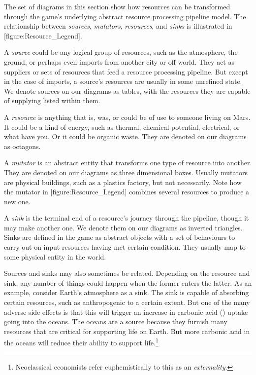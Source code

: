
The set of diagrams in this section show how resources can be transformed through the game's underlying abstract resource processing pipeline model. The relationship between {\it sources}, {\it mutators}, {\it resources}, and {\it sinks} is illustrated in [figure:Resource_Legend].

    {}
    
A {\it source} could be any logical group of resources, such as the atmosphere, the ground, or perhaps even imports from another city or off world.  They act as suppliers or sets of resources that feed a resource processing pipeline. But except in the case of imports, a source's resources are usually in some unrefined state. We denote sources on our diagrams as tables, with the resources they are capable of supplying listed within them.

A {\it resource} is anything that is, was, or could be of use to someone living on Mars. It could be a kind of energy, such as thermal, chemical potential, electrical, or what have you. Or it could be organic waste. They are denoted on our diagrams as octagons.

A {\it mutator} is an abstract entity that transforms one type of resource into another. They are denoted on our diagrams as three dimensional boxes. Usually mutators are physical buildings, such as a plastics factory, but not necessarily. Note how the mutator in [figure:Resource_Legend] combines several resources to produce a new one.

A {\it sink} is the terminal end of a resource's journey through the pipeline, though it may make another one. We denote them on our diagrams as inverted triangles. Sinks are defined in the game as abstract objects with a set of behaviours to carry out on input resources having met certain condition. They usually map to some physical entity in the world. 

Sources and sinks may also sometimes be related. Depending on the resource and sink, any number of things could happen when the former enters the latter. As an example, consider Earth's atmosphere as a sink. The sink is capable of absorbing certain resources, such as anthropogenic  to a certain extent. But one of the many adverse side effects is that this will trigger an increase in carbonic acid () uptake going into the oceans. The oceans are a source because they furnish many resources that are critical for supporting life on Earth. But more carbonic acid in the oceans will reduce their ability to support life.\footnote{Neoclassical economists refer euphemistically to this as an {\it externality}.} 


